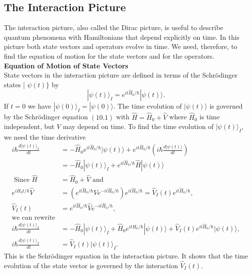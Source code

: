 \subsection{The Interaction Picture}
The interaction picture, also called the Dirac picture, is useful to describe quantum phenomena with Hamiltonians that depend explicitly on time. In this picture both state vectors and operators evolve in time. We need, therefore, to find the equation of motion for the state vectors and for the operators.\\
\textbf{Equation of Motion of State Vectors}\\
State vectors in the interaction picture are defined in terms of the Schrödinger states | $\psi(t)\}$ by
$$
|\psi(t)\rangle_{I}=e^{i t \hat{H}_{0} / \hbar}|\psi(t)\rangle .
$$
If $t=0$ we have $|\psi(0)\rangle_{I}=|\psi(0)\rangle$. The time evolution of $|\psi(t)\rangle$ is governed by the Schrödinger equation $(10.1)$ with $\hat{H}=\hat{H}_{0}+\hat{V}$ where $\hat{H}_{0}$ is time independent, but $\hat{V}$ may depend on time.
To find the time evolution of $|\psi(t)\rangle_{I}$, we need the time derivative 
$$
\begin{aligned}
i \hbar \frac{d|\psi(t)\rangle_{I}}{d t} &=-\hat{H}_{0} e^{i t \hat{H}_{0} / \hbar}|\psi(t)\rangle+e^{i t \hat{H}_{0} / \hbar}\left(i \hbar \frac{d|\psi(t)\rangle}{d t}\right) \\
&=-\hat{H}_{0}|\psi(t)\rangle_{I}+e^{i t \hat{H}_{0} / \hbar} \hat{H}|\psi(t)\rangle\\
\text { Since } \hat{H}&=\hat{H}_{0}+\hat{V} \text { and }\\
e^{i H_{0} t / \hbar} \hat{V}&=\left(e^{i t \hat{H}_{0} / \hbar} \hat{V} e^{-i t \hat{H}_{0} / \hbar}\right) e^{i t \hat{H}_{0} / \hbar}=\hat{V}_{I}(t) e^{i t \hat{H}_{0} / \hbar}, \\
\hat{V}_{I}(t)&=e^{i t \hat{H}_{0} / \hbar} \hat{V} e^{-i t \hat{H}_{0} / \hbar},\\
\text{we can rewrite}&\\
i \hbar \frac{d|\psi(t)\rangle_{I}}{d t}&=-\hat{H}_{0}|\psi(t)\rangle_{I}+\hat{H}_{0} e^{i t \hat{H}_{0} / \hbar}|\psi(t)\rangle+\hat{V}_{I}(t) e^{i t \hat{H}_{0} / \hbar}|\psi(t)\rangle, \\
i \hbar \frac{d|\psi(t)\rangle_{I}}{d t}&=\hat{V}_{I}(t)|\psi(t)\rangle_{I} .
\end{aligned}
$$
This is the Schrödinger equation in the interaction picture. It shows that the time evolution of the state vector is governed by the interaction $\hat{V}_{I}(t)$.\\\\
